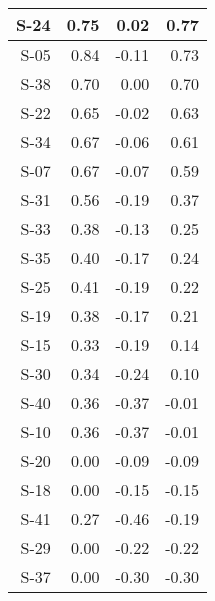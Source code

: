 \begin{tabular}{ | r | r | r | r | }
    \hline
                  S-24  &            0.75  &            0.02  &            0.77  \\
    \hline
                  S-05  &            0.84  &           -0.11  &            0.73  \\
    \hline
                  S-38  &            0.70  &            0.00  &            0.70  \\
    \hline
                  S-22  &            0.65  &           -0.02  &            0.63  \\
    \hline
                  S-34  &            0.67  &           -0.06  &            0.61  \\
    \hline
                  S-07  &            0.67  &           -0.07  &            0.59  \\
    \hline
                  S-31  &            0.56  &           -0.19  &            0.37  \\
    \hline
                  S-33  &            0.38  &           -0.13  &            0.25  \\
    \hline
                  S-35  &            0.40  &           -0.17  &            0.24  \\
    \hline
                  S-25  &            0.41  &           -0.19  &            0.22  \\
    \hline
                  S-19  &            0.38  &           -0.17  &            0.21  \\
    \hline
                  S-15  &            0.33  &           -0.19  &            0.14  \\
    \hline
                  S-30  &            0.34  &           -0.24  &            0.10  \\
    \hline
                  S-40  &            0.36  &           -0.37  &           -0.01  \\
    \hline
                  S-10  &            0.36  &           -0.37  &           -0.01  \\
    \hline
                  S-20  &            0.00  &           -0.09  &           -0.09  \\
    \hline
                  S-18  &            0.00  &           -0.15  &           -0.15  \\
    \hline
                  S-41  &            0.27  &           -0.46  &           -0.19  \\
    \hline
                  S-29  &            0.00  &           -0.22  &           -0.22  \\
    \hline
                  S-37  &            0.00  &           -0.30  &           -0.30  \\

\end{tabular}
